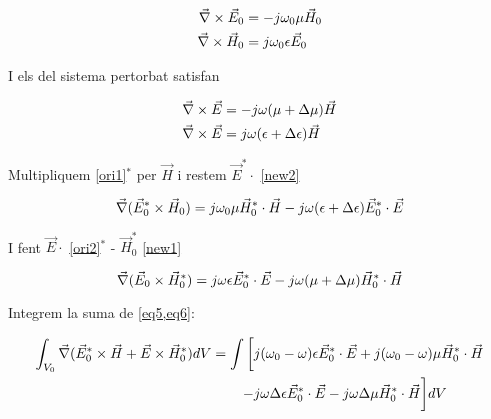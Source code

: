 \begin{subequations}
  \begin{align}
    \vec \nabla \times \vec E_0 &= - j  \omega _0 \mu \vec H_0 \label{ori1}\\
    \vec \nabla \times \vec H_0 &=  j  \omega _0 \epsilon \vec E_0 \label{ori2} 
  \end{align}
\end{subequations}

I els del sistema pertorbat satisfan

\begin{subequations}
  \begin{align}
    \vec \nabla \times \vec E &= - j  \omega (\mu + \Delta \mu) \vec H \label{new1} \\
    \vec \nabla \times \vec E &= j  \omega (\epsilon + \Delta \epsilon) \vec H \label{new2}
  \end{align}
\end{subequations}

Multipliquem  \cref{ori1}$^*$ per $\vec H$ i restem $\vec E^* \cdot$ \cref{new2}

\begin{equation}
  \vec \nabla (\vec E_0^* \times \vec H_0 ) = j \omega_0 \mu \vec H_0^* \cdot \vec H - j \omega (\epsilon + \Delta \epsilon) \vec E_0 ^* \cdot \vec E \label{eq5}
 \end{equation}

I fent $\vec E \cdot$ \cref{ori2}$^*$ - $\vec H_0 ^*$ \cref{new1}

\begin{equation}
  \vec \nabla (\vec E_0 \times \vec H_0 ^*) = j \omega \epsilon \vec E_0^* \cdot \vec E - j \omega (\mu + \Delta \mu) \vec H_0 ^* \cdot \vec H \label{eq6}
\end{equation}

Integrem la suma de \cref{eq5,eq6}:

\begin{equation}
  \begin{aligned}
  \int _{V_0} \vec \nabla ( \vec E_0 ^* \times \vec H + \vec E \times \vec H_0 ^*) dV = \int \bigg [ &j ( \omega_0 - \omega) \epsilon \vec E_0 ^* \cdot \vec E + j (\omega_0 - \omega) \mu \vec H_0 ^* \cdot \vec H \\
  - &j \omega \Delta \epsilon \vec E _0 ^* \cdot \vec E - j \omega \Delta \mu \vec H_0 ^ * \cdot \vec H \bigg ] dV
  \end{aligned}  
\end{equation}

